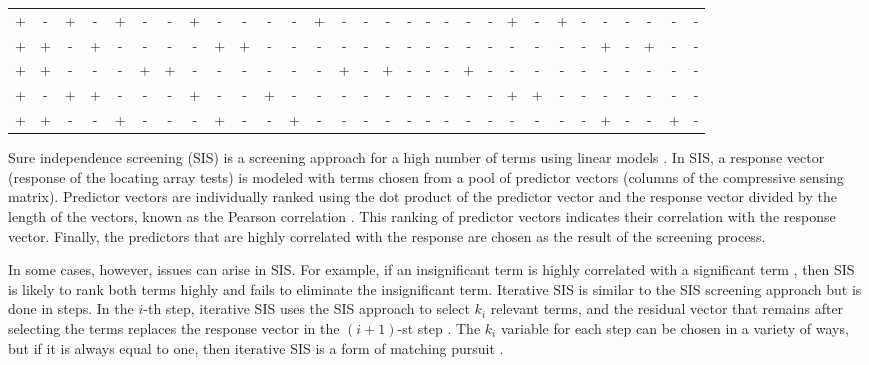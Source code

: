 \begin{center}
\begin{table}[htbp]
\begin{tabular}{|c|c|c|c|c|c|c|c|c|c|c|c|c|c|c|c|c|c|c|c|c|c|c|c|c|c|c|c|c|c|}
 + &	 - &	 + &	 - &	 + &	 - &	 - &	 + &	 - &	 - &	 - &	 - &	 + &	 - &	 - &	 - &	 - &	 - &	 - &	 - &	 - &	 + &	 - &	 + &	 - &	 - &	 - &	 - &	 - &	 - \\
 + &	 + &	 - &	 + &	 - &	 - &	 - &	 - &	 + &	 + &	 - &	 - &	 - &	 - &	 - &	 - &	 - &	 - &	 - &	 - &	 - &	 - &	 - &	 - &	 - &	 + &	 - &	 + &	 - &	 - \\
\hline
 + &	 + &	 - &	 - &	 - &	 + &	 + &	 - &	 - &	 - &	 - &	 - &	 - &	 + &	 - &	 + &	 - &	 - &	 - &	 + &	 - &	 - &	 - &	 - &	 - &	 - &	 - &	 - &	 - &	 - \\
 + &	 - &	 + &	 + &	 - &	 - &	 - &	 + &	 - &	 - &	 + &	 - &	 - &	 - &	 - &	 - &	 - &	 - &	 - &	 - &	 - &	 + &	 + &	 - &	 - &	 - &	 - &	 - &	 - &	 - \\
 + &	 + &	 - &	 - &	 + &	 - &	 - &	 - &	 + &	 - &	 - &	 + &	 - &	 - &	 - &	 - &	 - &	 - &	 - &	 - &	 - &	 - &	 - &	 - &	 - &	 + &	 - &	 - &	 + &	 - \\
\hline
\end{tabular}
\end{table}
\end{center}

Sure independence screening (SIS) is a screening approach for a high number of terms using linear models \cite{SIS}.
In SIS, a response vector (response of the locating array tests) is modeled with terms chosen from a pool of predictor vectors (columns of the compressive sensing matrix).
Predictor vectors are individually ranked using the dot product of the predictor vector and the response vector divided by the length of the vectors, known as the Pearson correlation \cite{SIS}.
This ranking of predictor vectors indicates their correlation with the response vector.
Finally, the predictors that are highly correlated with the response are chosen as the result of the screening process.

In some cases, however, issues can arise in SIS.
For example, if an insignificant term is highly correlated with a significant term \cite{IterativeSIS}, then SIS is likely to rank both terms highly and fails to eliminate the insignificant term.
Iterative SIS \cite{IterativeSIS} is similar to the SIS screening approach but is done in steps.
In the $i$-th step, iterative SIS uses the SIS approach to select $k_i$ relevant terms, and the residual vector that remains after selecting the terms replaces the response vector in the $(i + 1)$-st step \cite{IterativeSIS}.
The $k_i$ variable for each step can be chosen in a variety of ways, but if it is always equal to one, then iterative SIS is a form of matching pursuit \cite{IterativeSIS}.

